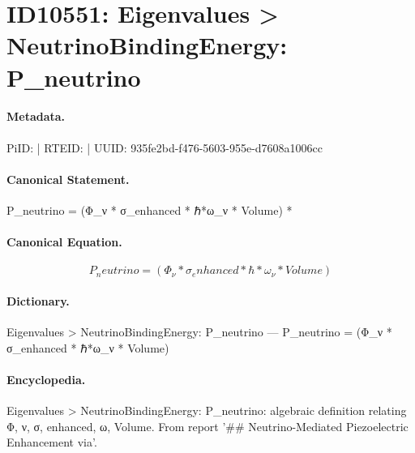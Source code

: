 \section*{ID10551: Eigenvalues > NeutrinoBindingEnergy: P\_neutrino}
\paragraph{Metadata.}
PiID:  | RTEID:  | UUID: 935fe2bd-f476-5603-955e-d7608a1006cc

\paragraph{Canonical Statement.}
P\_neutrino = (Φ\_ν * σ\_enhanced * ℏ*ω\_ν * Volume) *

\paragraph{Canonical Equation.}
\[
P_neutrino = (Φ_ν * σ_enhanced * ℏ*ω_ν * Volume)
\]

\paragraph{Dictionary.}
Eigenvalues > NeutrinoBindingEnergy: P\_neutrino — P\_neutrino = (Φ\_ν * σ\_enhanced * ℏ*ω\_ν * Volume)

\paragraph{Encyclopedia.}
Eigenvalues > NeutrinoBindingEnergy: P\_neutrino: algebraic definition relating Φ, ν, σ, enhanced, ω, Volume. From report '\#\# Neutrino-Mediated Piezoelectric Enhancement via'.
